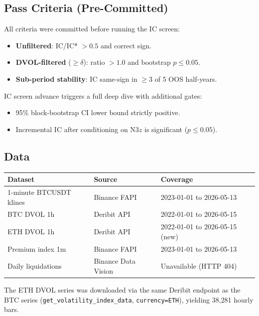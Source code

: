 \documentclass[12pt, a4paper]{article}
\theoremstyle{plain}
\theoremstyle{definition}
\begin{document}
\subsection{Pass Criteria (Pre-Committed)}

All criteria were committed before running the IC screen:
\begin{itemize}
  \item \textbf{Unfiltered}: IC/IC* $> 0.5$ and correct sign.
  \item \textbf{DVOL-filtered} ($\geq \delta$): ratio $> 1.0$ and bootstrap
        $p \leq 0.05$.
  \item \textbf{Sub-period stability}: IC same-sign in $\geq 3$ of 5
        OOS half-years.
\end{itemize}

IC screen advance triggers a full deep dive with additional gates:
\begin{itemize}
  \item 95\% block-bootstrap CI lower bound strictly positive.
  \item Incremental IC after conditioning on N3$z$ is significant ($p \leq 0.05$).
\end{itemize}

\subsection{Data}

\begin{center}
\begin{tabular}{lll}
\toprule
Dataset & Source & Coverage \\
\midrule
1-minute BTCUSDT klines & Binance FAPI & 2023-01-01 to 2026-05-13 \\
BTC DVOL 1h & Deribit API & 2022-01-01 to 2026-05-15 \\
ETH DVOL 1h & Deribit API & 2022-01-01 to 2026-05-15 (new) \\
Premium index 1m & Binance FAPI & 2023-01-01 to 2026-05-13 \\
Daily liquidations & Binance Data Vision & Unavailable (HTTP 404) \\
\bottomrule
\end{tabular}
\end{center}

The ETH DVOL series was downloaded via the same Deribit endpoint as the
BTC series (\texttt{get\_volatility\_index\_data}, \texttt{currency=ETH}),
yielding 38{,}281 hourly bars.

\end{document}
